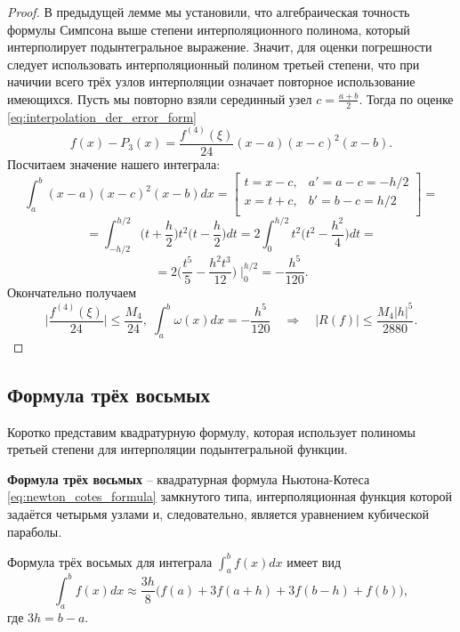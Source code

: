 \documentclass[../main.tex]{subfile}
\begin{document}
\begin{proof}
	В предыдущей лемме мы установили, что алгебраическая точность формулы
	Симпсона выше степени интерполяционного полинома, который интерполирует
	подынтегральное выражение. Значит, для оценки погрешности следует
	использовать интерполяционный полином третьей степени, что при начичии
	всего трёх узлов интерполяции означает повторное использование
	имеющихся. Пусть мы повторно взяли серединный узел $c=\frac{a+b}{2}$.
	Тогда по оценке \eqref{eq:interpolation_der_error_form}
	\[f(x)-P_3(x)=\frac{f^{(4)}(\xi)}{24}(x-a)(x-c)^2(x-b).\]
	Посчитаем значение нашего интеграла:
	\[\int_a^b (x-a)(x-c)^2(x-b)dx=
		\begin{bmatrix}
			t=x-c,	& a'=a-c=-h/2 \\
			x=t+c,	& b'=b-c=h/2\\
		\end{bmatrix}
		=
	\]
	\[=\int_{-h/2}^{h/2}\Big(t+\frac{h}{2}\Big)t^2\Big(t-\frac{h}{2}\Big)dt=
	2\int_0^{h/2}t^2\Big(t^2-\frac{h^2}{4}\Big)dt=\]
	\[=2\Big(\frac{t^5}{5}-\frac{h^2t^3}{12}\Big)\;\Big|_0^{h/2}=
	-\frac{h^5}{120}.\]
	Окончательно получаем
	\[\Big|\frac{f^{(4)}(\xi)}{24}\Big|\le\frac{M_4}{24},\;\int_a^b\omega(x)
	dx=-\frac{h^5}{120}\quad\Rightarrow\quad|R(f)|\le\frac{M_4|h|^5}{2880}.\]
\end{proof}

\subsection{Формула трёх восьмых}
Коротко представим квадратурную формулу, которая использует полиномы третьей
степени для интерполяции подынтегральной функции.

\begin{define}
	\textbf{Формула трёх восьмых} -- квадратурная формула Ньютона-Котеса
	\eqref{eq:newton_cotes_formula} замкнутого типа, интерполяционная
	функция которой задаётся четырьмя узлами и, следовательно, является
	уравнением кубической параболы.
\end{define}

\begin{theorem}\label{eq:simpsons_3_8_rule}
	Формула трёх восьмых для интеграла $\int_a^b f(x)dx$ имеет вид
	\[\boxed{\int_a^b f(x)dx\approx\frac{3h}{8}\big(f(a)+3f(a+h)+3f(b-h)+
	f(b)\big)},\]
	где $3h=b-a$.
\end{theorem}
\proofexercise
\end{document}
